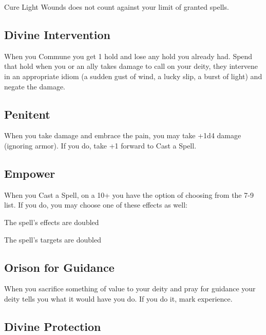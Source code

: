 Cure Light Wounds does not count against your limit of granted spells.

         
\subsection{Divine Intervention}    
         

When you Commune you get 1 hold and lose any hold you already had. Spend that hold when you or an ally takes damage to call on your deity, they intervene in an appropriate idiom (a sudden gust of wind, a lucky slip, a burst of light) and negate the damage.

         
\subsection{Penitent}   
         

When you take damage and embrace the pain, you may take +1d4 damage (ignoring armor). If you do, take +1 forward to Cast a Spell.

         
\subsection{Empower}   
         

When you Cast a Spell, on a 10+ you have the option of choosing from the 7-9 list. If you do, you may choose one of these effects as well:

         
\startitemize[1,packed]
           
\item The spell’s effects are doubled

           
\item The spell’s targets are doubled

         
\stopitemize
         
\subsection{Orison for Guidance}    
         

When you sacrifice something of value to your deity and pray for guidance your deity tells you what it would have you do. If you do it, mark experience.

         
\subsection{Divine Protection}    
         

